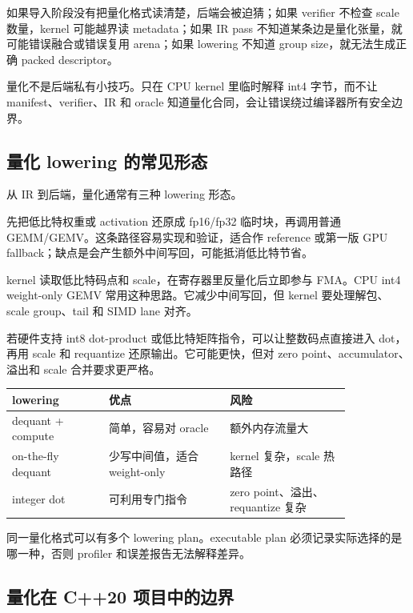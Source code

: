 如果导入阶段没有把量化格式读清楚，后端会被迫猜；如果 verifier 不检查 scale 数量，kernel 可能越界读 metadata；如果 IR pass 不知道某条边是量化张量，就可能错误融合或错误复用 arena；如果 lowering 不知道 group size，就无法生成正确 packed descriptor。

\begin{warningbox}
量化不是后端私有小技巧。只在 CPU kernel 里临时解释 int4 字节，而不让 manifest、verifier、IR 和 oracle 知道量化合同，会让错误绕过编译器所有安全边界。
\end{warningbox}

\subsection{量化 lowering 的常见形态}

从 IR 到后端，量化通常有三种 lowering 形态。

 先把低比特权重或 activation 还原成 fp16/fp32 临时块，再调用普通 GEMM/GEMV。这条路径容易实现和验证，适合作 reference 或第一版 GPU fallback；缺点是会产生额外中间写回，可能抵消低比特节省。

 kernel 读取低比特码点和 scale，在寄存器里反量化后立即参与 FMA。CPU int4 weight-only GEMV 常用这种思路。它减少中间写回，但 kernel 要处理解包、scale group、tail 和 SIMD lane 对齐。

 若硬件支持 int8 dot-product 或低比特矩阵指令，可以让整数码点直接进入 dot，再用 scale 和 requantize 还原输出。它可能更快，但对 zero point、accumulator、溢出和 scale 合并要求更严格。

\begin{center}
\begin{tabular}{p{0.24\linewidth}p{0.30\linewidth}p{0.30\linewidth}}
\toprule
lowering & 优点 & 风险 \\
\midrule
dequant + compute & 简单，容易对 oracle & 额外内存流量大 \\
on-the-fly dequant & 少写中间值，适合 weight-only & kernel 复杂，scale 热路径 \\
integer dot & 可利用专门指令 & zero point、溢出、requantize 复杂 \\
\bottomrule
\end{tabular}
\end{center}

同一量化格式可以有多个 lowering plan。executable plan 必须记录实际选择的是哪一种，否则 profiler 和误差报告无法解释差异。

\subsection{量化在 C++20 项目中的边界}

